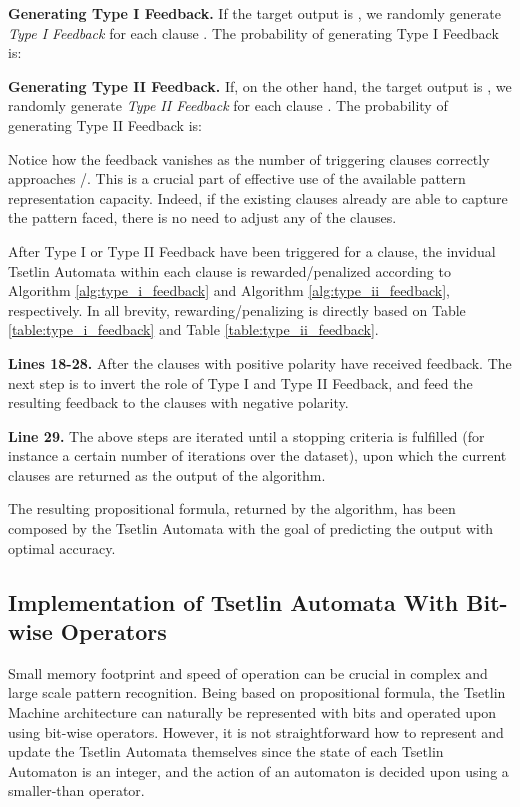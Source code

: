 \documentclass[11pt,a4paper]{article}
\begin{document}
{\bf Generating Type I Feedback.}  If the target output is , we randomly generate \emph{Type I Feedback} for each clause . The probability of generating Type I Feedback is:


{\bf Generating Type II Feedback.}  
If, on the other hand, the target output is , we randomly generate \emph{Type II Feedback} for each clause . The probability of generating Type II Feedback is:


Notice how the feedback vanishes as the number of triggering clauses correctly approaches /. This is a crucial part of effective use of the available pattern representation capacity. Indeed, if the existing clauses already are able to capture the pattern  faced, there is no need to adjust any of the clauses.

After Type I or Type II Feedback have been triggered for a clause, the invidual Tsetlin Automata within each clause is rewarded/penalized according to Algorithm \ref{alg:type_i_feedback} and Algorithm \ref{alg:type_ii_feedback}, respectively. In all brevity, rewarding/penalizing is directly based on Table \ref{table:type_i_feedback} and Table \ref{table:type_ii_feedback}.

{\bf Lines 18-28.} After the clauses with positive polarity have received feedback. The next step is to invert the role of Type I and Type II Feedback, and feed the resulting feedback to the clauses with negative polarity.

{\bf Line 29.} The above steps are iterated until a stopping criteria is fulfilled (for instance a certain number of iterations over the dataset), upon which the current clauses  are returned as the output of the algorithm.

The resulting propositional formula, returned by the algorithm,  has been composed by the Tsetlin Automata with the goal of predicting the output  with optimal accuracy.

\subsection{Implementation of Tsetlin Automata With Bit-wise Operators}

Small memory footprint and speed of operation can be crucial in complex and large scale pattern recognition. Being based on propositional formula, the Tsetlin Machine architecture can naturally be represented with bits and operated upon using bit-wise operators. However, it is not straightforward how to represent and update the Tsetlin Automata themselves since the state of each Tsetlin Automaton is an integer, and the action of an automaton is decided upon using a smaller-than operator.
\end{document}
